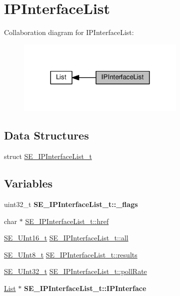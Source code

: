 \hypertarget{group__IPInterfaceList}{}\section{I\+P\+Interface\+List}
\label{group__IPInterfaceList}
Collaboration diagram for I\+P\+Interface\+List\+:\nopagebreak
\begin{figure}[H]
\begin{center}
\leavevmode
\includegraphics[width=228pt]{group__IPInterfaceList}
\end{center}
\end{figure}
\subsection*{Data Structures}
\begin{DoxyCompactItemize}
\item 
struct \hyperlink{structSE__IPInterfaceList__t}{S\+E\+\_\+\+I\+P\+Interface\+List\+\_\+t}
\end{DoxyCompactItemize}
\subsection*{Variables}
\begin{DoxyCompactItemize}
\item 
\mbox{\label{group__IPInterfaceList_gabcfa055fd653754af5238d54542c3883}} 
uint32\+\_\+t {\bfseries S\+E\+\_\+\+I\+P\+Interface\+List\+\_\+t\+::\+\_\+flags}
\item 
char $\ast$ \hyperlink{group__IPInterfaceList_ga8d2aa9f5037c9e3dd1c5f57574f18623}{S\+E\+\_\+\+I\+P\+Interface\+List\+\_\+t\+::href}
\item 
\hyperlink{group__UInt16_gac68d541f189538bfd30cfaa712d20d29}{S\+E\+\_\+\+U\+Int16\+\_\+t} \hyperlink{group__IPInterfaceList_ga7599acc849916884bf2ab40af9644c87}{S\+E\+\_\+\+I\+P\+Interface\+List\+\_\+t\+::all}
\item 
\hyperlink{group__UInt8_gaf7c365a1acfe204e3a67c16ed44572f5}{S\+E\+\_\+\+U\+Int8\+\_\+t} \hyperlink{group__IPInterfaceList_ga4ef447fb08fb976a9d26d9764d111abb}{S\+E\+\_\+\+I\+P\+Interface\+List\+\_\+t\+::results}
\item 
\hyperlink{group__UInt32_ga70bd4ecda3c0c85d20779d685a270cdb}{S\+E\+\_\+\+U\+Int32\+\_\+t} \hyperlink{group__IPInterfaceList_gacffb60f8d3c1549c12714eb33d91d745}{S\+E\+\_\+\+I\+P\+Interface\+List\+\_\+t\+::poll\+Rate}
\item 
\mbox{\label{group__IPInterfaceList_gad86b233379b38db0bb467ad0ee4379c4}} 
\hyperlink{structList}{List} $\ast$ {\bfseries S\+E\+\_\+\+I\+P\+Interface\+List\+\_\+t\+::\+I\+P\+Interface}
\end{DoxyCompactItemize}


